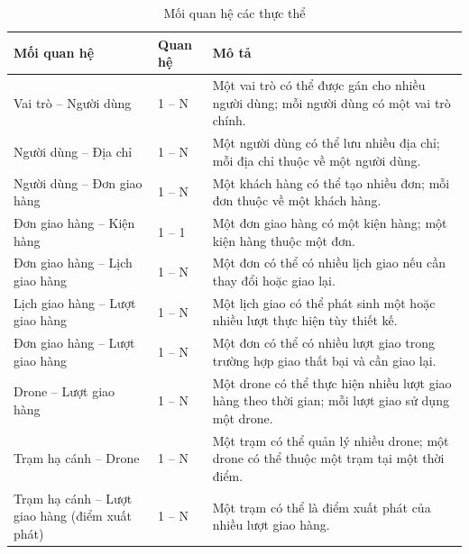 \begin{longtable}{|L{4.5cm}|C{2cm}|L{7.5cm}|}
\caption{Mối quan hệ các thực thể}
\label{tab:moi-quan-he-thuc-the}
\\
\hline
\textbf{Mối quan hệ} &
\textbf{Quan hệ} &
\textbf{Mô tả} \\
\hline
\endfirsthead


\hline
\endlastfoot

Vai trò -- Người dùng
& 1 -- N
& Một vai trò có thể được gán cho nhiều người dùng; mỗi người dùng có một vai trò chính.
\\ \hline

Người dùng -- Địa chỉ
& 1 -- N
& Một người dùng có thể lưu nhiều địa chỉ; mỗi địa chỉ thuộc về một người dùng.
\\ \hline

Người dùng -- Đơn giao hàng
& 1 -- N
& Một khách hàng có thể tạo nhiều đơn; mỗi đơn thuộc về một khách hàng.
\\ \hline

Đơn giao hàng -- Kiện hàng
& 1 -- 1
& Một đơn giao hàng có một kiện hàng; một kiện hàng thuộc một đơn.
\\ \hline

Đơn giao hàng -- Lịch giao hàng
& 1 -- N
& Một đơn có thể có nhiều lịch giao nếu cần thay đổi hoặc giao lại.
\\ \hline

Lịch giao hàng -- Lượt giao hàng
& 1 -- N
& Một lịch giao có thể phát sinh một hoặc nhiều lượt thực hiện tùy thiết kế.
\\ \hline

Đơn giao hàng -- Lượt giao hàng
& 1 -- N
& Một đơn có thể có nhiều lượt giao trong trường hợp giao thất bại và cần giao lại.
\\ \hline

Drone -- Lượt giao hàng
& 1 -- N
& Một drone có thể thực hiện nhiều lượt giao hàng theo thời gian; mỗi lượt giao sử dụng một drone.
\\ \hline

Trạm hạ cánh -- Drone
& 1 -- N
& Một trạm có thể quản lý nhiều drone; một drone có thể thuộc một trạm tại một thời điểm.
\\ \hline

Trạm hạ cánh -- Lượt giao hàng (điểm xuất phát)
& 1 -- N
& Một trạm có thể là điểm xuất phát của nhiều lượt giao hàng.
\\ \hline


\end{longtable}
